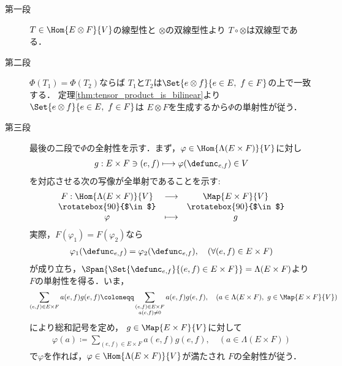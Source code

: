 	\begin{prf}\mbox{}
		\begin{description}
			\item[第一段]
				$T \in \Hom{E \otimes F}{V}$の線型性と
				$\otimes$の双線型性より
				$T \circ \otimes$は双線型である．
				
			\item[第二段]
				$\Phi(T_1) = \Phi(T_2)$ならば
				$T_1$と$T_2$は$\Set{e \otimes f}{e \in E,\ f \in F}$の上で一致する．
				定理\ref{thm:tensor_product_is_bilinear}より
				$\Set{e \otimes f}{e \in E,\ f \in F}$は
				$E \otimes F$を生成するから$\Phi$の単射性が従う．
			
			\item[第三段]
				最後の二段で$\Phi$の全射性を示す．まず，$\varphi \in \Hom{\Lambda(E \times F)}{V}$に対し
				\begin{align}
					g: E \times F \ni (e,f) \longmapsto \varphi(\defunc_{e,f}) \in V
				\end{align}
				を対応させる次の写像が全単射であることを示す:
				\begin{align}
					\begin{array}{ccc}
						F:\Hom{\Lambda(E \times F)}{V} & \longrightarrow & \Map{E \times F}{V} \\
						\rotatebox{90}{$\in$} & & \rotatebox{90}{$\in$} \\
						\varphi & \longmapsto & g
					\end{array}
				\end{align}
				実際，$F(\varphi_1) = F(\varphi_2)$なら
				\begin{align}
					\varphi_1(\defunc_{e,f}) = \varphi_2(\defunc_{e,f}),
					\quad (\forall (e,f) \in E \times F)
				\end{align}
				が成り立ち，$\Span{\Set{\defunc_{e,f}}{(e,f) \in E \times F}}=\Lambda(E \times F)$より
				$F$の単射性を得る．いま，
				\begin{align}
					\sum_{(e,f) \in E \times F} a(e,f) g(e,f)
					\coloneqq \sum_{\substack{(e,f) \in E \times F \\ a(e,f) \neq 0}} a(e,f) g(e,f),
					\quad (a \in \Lambda(E \times F),\ g \in \Map{E \times F}{V})
				\end{align}
				により総和記号を定め，
				$g \in \Map{E \times F}{V}$に対して
				\begin{align}
					\varphi(a) \coloneqq \sum_{(e,f) \in E \times F} a(e,f) g(e,f),
					\quad (a \in \Lambda(E \times F))
				\end{align}
				で$\varphi$を作れば，$\varphi \in \Hom{\Lambda(E \times F)}{V}$が満たされ
				$F$の全射性が従う．
				

\end{description}
\end{prf}
